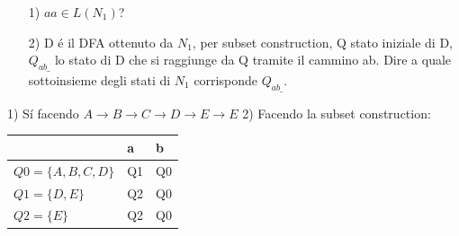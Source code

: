 \begin{itemize}
    \item[1)] $aa \in L(N_1)$?\\
    \item[2)] D \'e il DFA ottenuto da $N_1$, per subset construction, Q stato iniziale di D, $Q_{ab\_}$ lo stato di D che si 
    raggiunge da Q tramite il cammino ab. Dire a quale sottoinsieme degli stati di $N_1$ corrisponde $Q_{ab\_}$.\\    
\end{itemize}

1) S\'i facendo $A \rightarrow B \rightarrow C \rightarrow D \rightarrow E \rightarrow E $
2) Facendo la subset construction:

\begin{center}
    \begin{tabular}{|l|l|l|}
        \hline
                                &   a   &  b    \\
        \hline
            $Q0 = \{A,B,C,D\}$  &   Q1  &  Q0   \\
        \hline
            $Q1 = \{D,E\}$      &   Q2  &  Q0   \\
        \hline
           $Q2 = \{E\}$         &   Q2  &  Q0   \\
        \hline
    \end{tabular}
\end{center} 